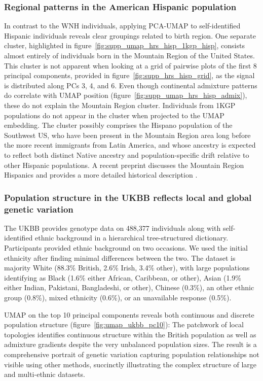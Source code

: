 \documentclass[12pt]{pnas-new}
\begin{document}
\subsubsection*{Regional patterns in the American Hispanic population} In contrast to the WNH individuals, applying PCA-UMAP to self-identified Hispanic individuals reveals clear groupings related to birth region. One separate cluster, highlighted in figure~\ref{fig:supp_umap_hrs_hisp_1kgp_hisp}, consists almost entirely of individuals born in the Mountain Region of the United States. This cluster is not apparent when looking at a grid of pairwise plots of the first 8 principal components, provided in figure~\ref{fig:supp_hrs_hisp_grid}, as the signal is distributed along PCs 3, 4, and 6. Even though continental admixture patterns do correlate with UMAP position (figure~\ref{fig:supp_umap_hrs_hisp_admix}), these do not explain the Mountain Region cluster. Individuals from 1KGP populations do not appear in the cluster when projected to the UMAP embedding. The cluster possibly comprises the Hispano population of the Southwest US, who have been present in the Mountain Region area long before the more recent immigrants from Latin America, and whose ancestry is expected to reflect both distinct Native ancestry and population-specific drift relative to other Hispanic populations. A recent preprint discusses the Mountain Region Hispanics and provides a more detailed historical description \cite{Jordan333609}.  

\subsubsection*{Population structure in the UKBB reflects local and global genetic variation} The UKBB provides genotype data on 488,377 individuals along with self-identified ethnic background in a hierarchical tree-structured dictionary. Participants provided ethnic background on two occasions. We used the initial ethnicity after finding minimal differences between the two. The dataset is majority White (88.3\% British, 2.6\% Irish, 3.4\% other), with large populations identifying as Black (1.6\% either African, Caribbean, or other), Asian (1.9\% either Indian, Pakistani, Bangladeshi, or other), Chinese (0.3\%), an other ethnic group (0.8\%), mixed ethnicity (0.6\%), or an unavailable response (0.5\%). 

UMAP on the top 10 principal components reveals both continuous and discrete population structure (figure~\ref{fig:umap_ukbb_pc10}): The patchwork of local topologies identifies continuous structure within the British population as well as admixture gradients despite the very unbalanced population sizes. The result is a comprehensive portrait of genetic variation capturing population relationships not visible using other methods, succinctly illustrating the complex structure of large and multi-ethnic datasets.
\end{document}
